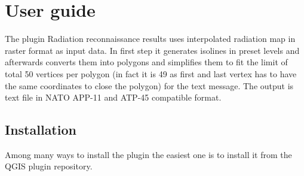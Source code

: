\chapter{User guide}
\label{user-guide}

The plugin Radiation reconnaissance results uses interpolated radiation
map in raster format as input data. In first step it generates isolines
in preset levels and afterwards converts them into polygons and
simplifies them to fit the limit of total 50 vertices per polygon (in
fact it is 49 as first and last vertex has to have the same coordinates
to close the polygon) for the text message. The output is text file in
NATO APP-11 and ATP-45 compatible format.

\section{Installation}
\label{installation}

Among many ways to install the plugin the easiest one is to install it
from the QGIS plugin repository.


